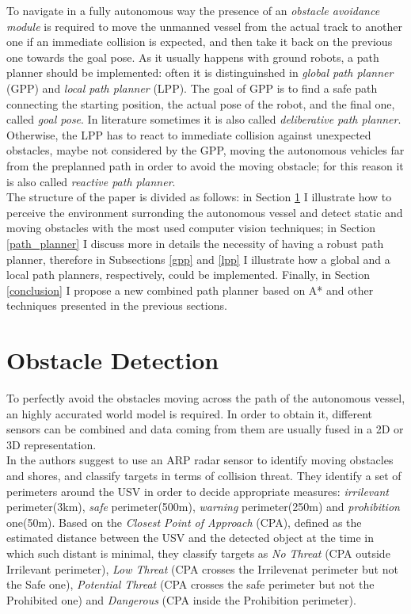 \documentclass[journal]{IEEEtran}
\begin{document}
      \indent To navigate in a fully autonomous way the presence of an \textit{obstacle avoidance module} is required to move the unmanned vessel from the actual track to another one if an immediate collision is expected, and then take it back on the previous one towards the goal pose. As it usually happens with ground robots, a path planner should be implemented: often it is distinguinshed in \textit{global path planner} (GPP) and \textit{local path planner} (LPP). The goal of GPP is to find a safe path connecting the starting position, the actual pose of the robot, and the final one, called \textit{goal pose}. In literature sometimes it is also called \textit{deliberative path planner}. Otherwise, the LPP has to react to immediate collision against unexpected obstacles, maybe not considered by the GPP, moving the autonomous vehicles far from the preplanned path in order to avoid the moving obstacle; for this reason it is also called \textit{reactive path planner}.\\

      \indent The structure of the paper is divided as follows: in Section \ref{obs_det} I illustrate how to perceive the environment surronding the autonomous vessel and detect static and moving obstacles with the most used computer vision techniques; in Section \ref{path_planner} I discuss more in details the necessity of having a robust path planner, therefore in Subsections \ref{gpp} and \ref{lpp} I illustrate how a global and a local path planners, respectively, could be implemented. Finally, in Section \ref{conclusion} I propose a new combined path planner based on A* and other techniques presented in the previous sections.


\section{Obstacle Detection} \label{obs_det}

      \indent To perfectly avoid the obstacles moving across the path of the autonomous vessel, an highly accurated world model is required. In order to obtain it, different sensors can be combined and data coming from them are usually fused in a 2D or 3D representation.\\

      \indent In \cite{Almeida2009} the authors suggest to use an ARP radar sensor to identify moving obstacles and shores, and classify targets in terms of collision threat. They identify a set of perimeters around the USV in order to decide appropriate measures: \textit{irrilevant} perimeter(3km), \textit{safe} perimeter(500m), \textit{warning} perimeter(250m) and \textit{prohibition} one(50m). Based on the \textit{Closest Point of Approach} (CPA), defined as the estimated distance between the USV and the detected object at the time in which such distant is minimal, they classify targets as \textit{No Threat} (CPA outside Irrilevant perimeter), \textit{Low Threat} (CPA crosses the Irrilevenat perimeter but not the Safe one), \textit{Potential Threat} (CPA crosses the safe perimeter but not the Prohibited one) and \textit{Dangerous} (CPA inside the Prohibition perimeter).\\
\end{document}
